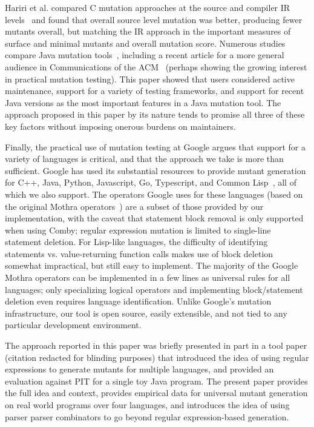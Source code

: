 \documentclass[sigconf,review, anonymous]{acmart}
\begin{document}
{Hariri et al. compared C mutation approaches at the source and
compiler IR levels~\cite{CompareSrcBinary} and found that overall
source level mutation was better, producing fewer mutants overall, but
matching the IR approach in the important measures of surface and
minimal mutants and overall mutation score.  Numerous studies compare
Java mutation tools~\cite{MajorPIT,gopinath2017does}, including a
recent article for a more general audience in Communications of the
ACM~\cite{CommACMJavaTool} (perhaps showing the growing interest in
practical mutation testing).  This paper showed that users
considered active maintenance, support for a variety of testing
frameworks, and support for recent Java versions as the most important
features in a Java mutation tool.  The approach proposed in this paper
by its nature tends to promise all three of these key factors without
imposing onerous burdens on maintainers.

Finally, the practical use of mutation testing at Google argues that
support for a variety of languages is critical, and that the approach
we take is more than sufficient.  Google has used its
substantial resources to provide mutant generation for C++, Java,
Python, Javascript, Go, Typescript, and Common
Lisp~\cite{PetrovicMutationGoogle}, all of which we also support.  The
operators Google uses for these
languages (based on the original Mothra operators~\cite{offutt1996experimental}) are a subset of those provided by our implementation, with the caveat
that statement block removal is only supported when using Comby;
regular expression mutation is limited to single-line statement
deletion.  For Lisp-like languages, the difficulty of identifying statements vs. value-returning
function calls makes use of block deletion somewhat impractical, but
still easy to implement.  The majority of the Google Mothra operators
can be implemented in
a few lines as universal rules for all languages; only specializing
logical operators and implementing block/statement deletion even requires
language identification.  Unlike Google's mutation infrastructure, our
tool is open source, easily extensible, and not tied to any particular
development environment.

The approach reported in this paper was briefly presented in part in a
tool paper (citation redacted for blinding purposes) that introduced
the idea of using regular expressions to generate mutants for multiple
languages, and provided an evaluation against PIT for a single toy
Java program.  The present paper provides the full idea and context,
provides empirical data for universal mutant generation on real world
programs over four languages,
and introduces the idea of using parser parser combinators to go
beyond regular expression-based generation.

}
\end{document}

